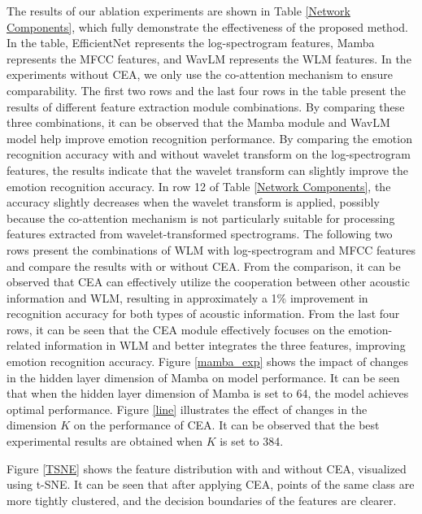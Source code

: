 \documentclass[runningheads]{llncs}
\begin{document}
The results of our ablation experiments are shown in Table \ref{Network Components}, which fully demonstrate the effectiveness of the proposed method. In the table, EfficientNet represents the log-spectrogram features, Mamba represents the MFCC features, and WavLM represents the WLM features. In the experiments without CEA, we only use the co-attention mechanism to ensure comparability.  The first two rows and the last four rows in the table present the results of different feature extraction module combinations. By comparing these three combinations, it can be observed that the Mamba module and WavLM model help improve emotion recognition performance. By comparing the emotion recognition accuracy with and without wavelet transform on the log-spectrogram features, the results indicate that the wavelet transform can slightly improve the emotion recognition accuracy. In row 12 of Table \ref{Network Components}, the accuracy slightly decreases when the wavelet transform is applied, possibly because the co-attention mechanism is not particularly suitable for processing features extracted from wavelet-transformed spectrograms. The following two rows present the combinations of WLM with log-spectrogram and MFCC features and compare the results with or without CEA. From the comparison, it can be observed that CEA can effectively utilize the cooperation between other acoustic information and WLM, resulting in approximately a 1\% improvement in recognition accuracy for both types of acoustic information. From the last four rows, it can be seen that the CEA module effectively focuses on the emotion-related information in WLM and better integrates the three features, improving emotion recognition accuracy. Figure \ref{mamba_exp} shows the impact of changes in the hidden layer dimension of Mamba on model performance. It can be seen that when the hidden layer dimension of Mamba is set to 64, the model achieves optimal performance. Figure \ref{line} illustrates the effect of changes in the dimension \( K \) on the performance of CEA. It can be observed that the best experimental results are obtained when \( K \) is set to 384.

Figure \ref{TSNE} shows the feature distribution with and without CEA, visualized using t-SNE. It can be seen that after applying CEA, points of the same class are more tightly clustered, and the decision boundaries of the features are clearer.
\end{document}
